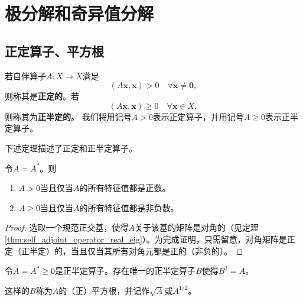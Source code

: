 \section{极分解和奇异值分解}

\subsection{正定算子、平方根}

\begin{definition*}
    若自伴算子$A:X\to X$满足\[(A\mathbf{x},\mathbf{x})>0\quad\forall\mathbf{x}\neq\mathbf{0},\]
    则称其是{\bf 正定的}。若\[(A\mathbf{x},\mathbf{x})\ge 0\quad\forall\mathbf{x}\in X,\]
    则称其为{\bf 正半定的}。
    我们将用记号$A>0$表示正定算子，并用记号$A\ge 0$表示正半定算子。
\end{definition*}

下述定理描述了正定和正半定算子。

\begin{theorem}
    令$A=A^*$。则
    \begin{enumerate}
        \item $A>0$当且仅当$A$的所有特征值都是正数。
        \item $A\ge 0$当且仅当$A$的所有特征值都是非负数。
    \end{enumerate}
\end{theorem}
\begin{proof}
    选取一个规范正交基，使得$A$关于该基的矩阵是对角的（见定理 \ref{thm:self_adjoint_operator_real_eig}）。为完成证明，只需留意，对角矩阵是正定（正半定）的，当且仅当其所有对角元都是正的（非负的）。
\end{proof}

\begin{corollary}
    令$A=A^*\ge 0$是正半定算子。存在唯一的正半定算子$B$使得$B^2=A$。
\end{corollary}

这样的$B$称为$A$的（正）平方根，并记作$\sqrt{A}$或$A^{1/2}$。

